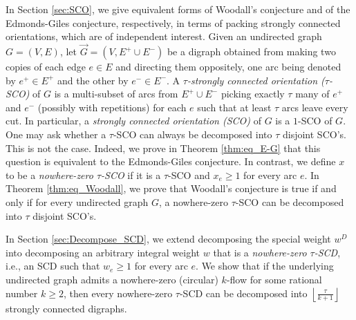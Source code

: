 \documentclass[runningheads]{llncs}
\newcommand{\rounddown}[1]{\left\lfloor#1\right\rfloor}
\begin{document}
\vspace{1em}
In Section \ref{sec:SCO}, we give equivalent forms of Woodall's conjecture and of the Edmonds-Giles conjecture, respectively, in terms of packing strongly connected orientations, which are of independent interest. Given an undirected graph $G=(V,E)$, let $\vec{G}=(V,E^+\cup E^-)$ be a digraph obtained from making two copies of each edge $e\in E$ and directing them oppositely, one arc being denoted by $e^+\in E^+$ and the other by $e^-\in E^-$. A \textit{$\tau$-strongly connected orientation ($\tau$-SCO)} of $G$ is a multi-subset of arcs from $E^+\cup E^-$ picking exactly $\tau$ many of $e^+$ and $e^-$ (possibly with repetitions) for each $e$ such that at least $\tau$ arcs leave every cut. In particular, a \textit{strongly connected orientation (SCO)} of $G$ is a $1$-SCO of $G$. 
One may ask whether a $\tau$-SCO can always be decomposed into $\tau$ disjoint SCO's. This is not the case. Indeed,
we prove in Theorem \ref{thm:eq_E-G} that
this question is equivalent to the Edmonds-Giles conjecture.
In contrast, we define $x$ to be a \textit{nowhere-zero $\tau$-SCO} if it is a $\tau$-SCO and $x_e\geq 1$ for every arc $e$.
In Theorem \ref{thm:eq_Woodall}, we prove that Woodall's conjecture is true if and only if for every undirected graph $G$, a nowhere-zero $\tau$-SCO can be decomposed into $\tau$ disjoint SCO's.

In Section \ref{sec:Decompose_SCD}, we extend decomposing the special weight $w^D$ into decomposing an arbitrary integral weight $w$ that is a \textit{nowhere-zero $\tau$-SCD}, i.e., an SCD such that $w_e\geq 1$ for every arc $e$. We show that if the underlying undirected graph admits a nowhere-zero (circular) $k$-flow for some rational number $k\geq 2$, then every nowhere-zero $\tau$-SCD can be decomposed into $\rounddown{\frac{\tau}{k+1}}$ strongly connected digraphs.
\end{document}
